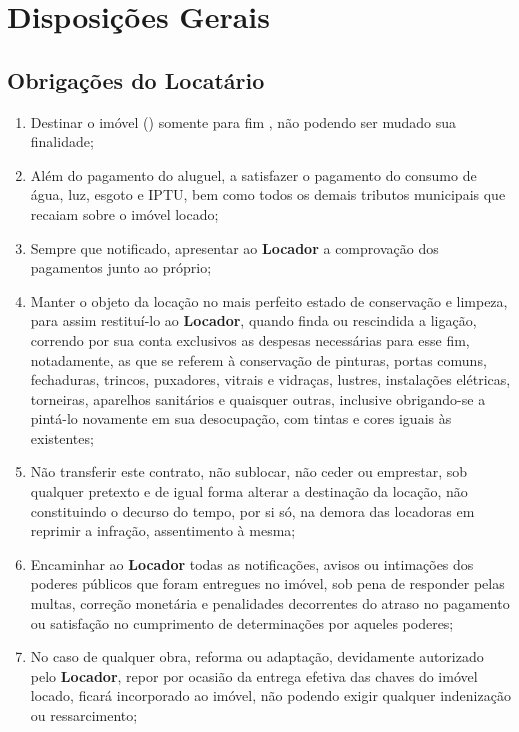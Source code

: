 \section{Disposições Gerais}\label{sec:rules}

\subsection{Obrigações do \textbf{Locatário}}\label{sub-seb:renter-rules}

\begin{enumerate}
    \item Destinar o imóvel (\tipoImovel) somente para fim \FinalidadeImovel, não podendo ser mudado sua finalidade;
    \item Além do pagamento do aluguel, a satisfazer o pagamento do consumo de água, luz, esgoto e IPTU, bem como todos os demais tributos municipais que recaiam sobre o imóvel locado;
    \item Sempre que notificado, apresentar ao \textbf{Locador} a comprovação dos pagamentos junto ao próprio;
    \item Manter o objeto da locação no mais perfeito estado de conservação e limpeza, para assim restituí-lo ao \textbf{Locador}, quando finda ou rescindida a ligação, correndo por sua conta exclusivos as despesas necessárias para esse fim, notadamente, as que se referem à conservação de pinturas, portas comuns, fechaduras, trincos, puxadores, vitrais e vidraças, lustres, instalações elétricas, torneiras, aparelhos sanitários e quaisquer outras, inclusive obrigando-se a pintá-lo novamente em sua desocupação, com tintas e cores iguais às existentes; 
    \item Não transferir este contrato, não sublocar, não ceder ou emprestar, sob qualquer pretexto e de igual forma alterar a destinação da locação, não constituindo o decurso do tempo, por si só, na demora das locadoras em reprimir a infração, assentimento à mesma;
    \item Encaminhar ao \textbf{Locador} todas as notificações, avisos ou intimações dos poderes públicos que foram entregues no imóvel, sob pena de responder pelas multas, correção monetária e penalidades decorrentes do atraso no pagamento ou satisfação no cumprimento de determinações por aqueles poderes;
    \item No caso de qualquer obra, reforma ou adaptação, devidamente autorizado pelo \textbf{Locador}, repor por ocasião da entrega efetiva das chaves do imóvel locado, ficará incorporado ao imóvel, não podendo exigir qualquer indenização ou ressarcimento;

\end{enumerate}
